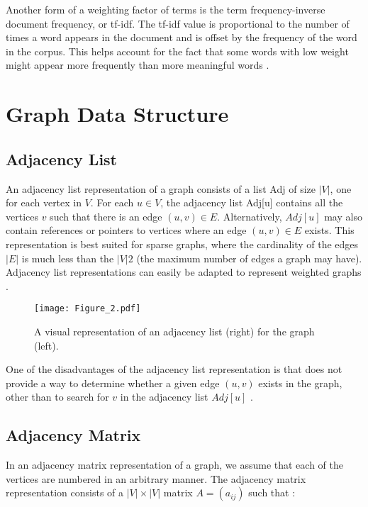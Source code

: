 \documentclass[10pt,11pt,12pt,oneside]{book}
\begin{document}
	Another form of a weighting factor of terms is the term frequency-inverse document frequency, or tf-idf. The tf-idf value is proportional to the number of times a word appears in the document and is offset by the frequency of the word in the corpus. This helps account for the fact that some words with low weight might appear more frequently than more meaningful words \cite{luhn19571}.
	
	\section{Graph Data Structure}
	\subsection{Adjacency List}
	An adjacency list representation of a graph consists of a list Adj of size $|V|$, one for each vertex in $V$. For each $u \in V$, the adjacency list Adj[u] contains all the vertices $v$ such that there is an edge $(u, v) \in E$. Alternatively, $Adj[u]$ may also contain references or pointers to vertices where an edge $(u, v) \in E$ exists. This representation is best suited for sparse graphs, where the cardinality of the edges $|E|$ is much less than the $|V|2$ (the maximum number of edges a graph may have). Adjacency list representations can easily be adapted to represent weighted graphs \cite{beel2016paper}.\\
	
	\begin{figure}[!htb]
		\centering
		\texttt{[image: Figure\_2.pdf]}
		\caption{A visual representation of an adjacency list (right) for the graph (left).}
		\label{fig:adjacency_list}
	\end{figure}
	
	One of the disadvantages of the adjacency list representation is that does not provide a way to determine whether a given edge $(u, v)$ exists in the graph, other than to search for $v$ in the adjacency list $Adj[u]$ \cite{beel2016paper}.
	
	\subsection{Adjacency Matrix}
	In an adjacency matrix representation of a graph, we assume that each of the vertices are numbered in an arbitrary manner. The adjacency matrix representation consists of a $|V| \times |V|$ matrix $A = (a_{ij})$ such that \cite{beel2016paper}:\\
	
\end{document}
